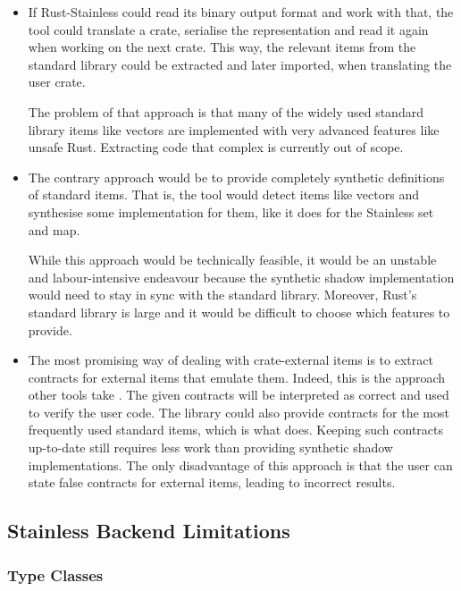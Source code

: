 \begin{itemize}

\item If Rust-Stainless could read its binary output format and work with that,
the tool could translate a crate, serialise the representation and read it again
when working on the next crate. This way, the relevant items from the standard
library could be extracted and later imported, when translating the user crate.

The problem of that approach is that many of the widely used standard library
items like vectors are implemented with very advanced features like unsafe Rust.
Extracting code that complex is currently out of scope.

\item The contrary approach would be to provide completely synthetic definitions
of standard items. That is, the tool would detect items like vectors and
synthesise some implementation for them, like it does for the Stainless set and
map.

While this approach would be technically feasible, it would be an unstable and
labour-intensive endeavour because the synthetic shadow implementation would
need to stay in sync with the standard library. Moreover, Rust's standard
library is large and it would be difficult to  choose which features to provide.

\item The most promising way of dealing with crate-external items is to extract
contracts for external items that emulate them. Indeed, this is the approach
other tools take \cite{prusti, mirai}. The given contracts will be interpreted
as correct and used to verify the user code. The library could also provide
contracts for the most frequently used standard items, which is what
\cite{mirai} does. Keeping such contracts up-to-date still requires less work
than providing synthetic shadow implementations. The only disadvantage of this
approach is that the user can state false contracts for external items, leading
to incorrect results.

\end{itemize}

\subsection{Stainless Backend Limitations}

\subsubsection{Type Classes}

